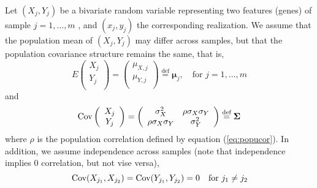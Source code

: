 	Let $(X_j, Y_j)$ be a bivariate random variable representing two features (genes) of sample $j 
	= 1, \ldots, m$ , and $(x_j, y_j)$ the corresponding realization.
	We assume that the population mean of $(X_j, Y_j)$ may differ across samples, but that the 
	population covariance structure remains the 
	same, that is,  
	\begin{equation}\label{eq:meanstruct}
	E  \left(\begin{array}{c}
	X_j\\
	Y_j\\	
	\end{array} \right) 
	= 	\left(\begin{array}{c}
	\mu_{X,j}\\
	\mu_{Y,j}\\
	\end{array} \right)\stackrel{\text{def}}{=} \bm \mu_j,  \text{~~ for $j = 1, \ldots, m$}
	\end{equation}
	and 
	\begin{equation}\label{eq:covstruct}
	\text{Cov}\left(\begin{array}{c}
	X_j\\
	Y_j\\	
	\end{array} \right)	
	= \left(
	\begin{array}{cc}
	\sigma_X^2 &\rho \sigma_X\sigma_Y \\
	\rho \sigma_X \sigma_Y & 	\sigma_Y^2 \\
	\end{array} 
	\right)
	\stackrel{\text{def}}{=} \bm \Sigma 
	\end{equation}
	where $\rho$ is the population correlation defined by equation (\ref{eq:popucor}). In addition, 
	we assume independence across samples (note that independence implies 0 correlation, but not 
	vise versa), 
	\begin{equation}\label{eq:indepsamples}
	\text{Cov}(X_{j_1}, X_{j_2}) = \text{Cov}(Y_{j_1}, Y_{j_2}) = 0 \text{~~~for $j_1\neq j_2$}
	\end{equation}
	
	
	
	
	
